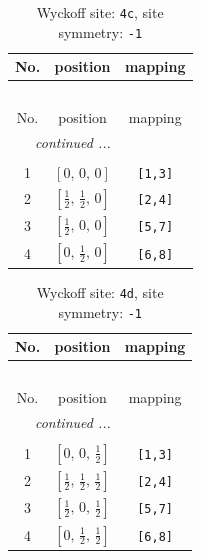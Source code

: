 \documentclass[fleqn,8pt]{jsarticle}
\begin{document}
\renewcommand{\arraystretch}{1.2}
\begin{longtable}{ccc}
\caption{Wyckoff site: {\tt 4c}, site symmetry: {\tt -1}}
 \\
 \hline \hline
No. & position & mapping \\ \hline \endfirsthead

\multicolumn{2}{l}{\tablename\ \thetable{}} \\
 \hline \hline
No. & position & mapping \\ \hline \endhead

 \hline \hline
\multicolumn{2}{r}{\footnotesize\it continued ...} \\ \endfoot

 \hline \hline
\multicolumn{2}{r}{} \\ \endlastfoot

1 & $\left[ 0,\, 0,\, 0 \right]$ & {\tt [1,3]} \\ \hline
2 & $\left[ \frac{1}{2},\, \frac{1}{2},\, 0 \right]$ & {\tt [2,4]} \\ \hline
3 & $\left[ \frac{1}{2},\, 0,\, 0 \right]$ & {\tt [5,7]} \\ \hline
4 & $\left[ 0,\, \frac{1}{2},\, 0 \right]$ & {\tt [6,8]} \\
\end{longtable}
\renewcommand{\arraystretch}{1.2}
\begin{longtable}{ccc}
\caption{Wyckoff site: {\tt 4d}, site symmetry: {\tt -1}}
 \\
 \hline \hline
No. & position & mapping \\ \hline \endfirsthead

\multicolumn{2}{l}{\tablename\ \thetable{}} \\
 \hline \hline
No. & position & mapping \\ \hline \endhead

 \hline \hline
\multicolumn{2}{r}{\footnotesize\it continued ...} \\ \endfoot

 \hline \hline
\multicolumn{2}{r}{} \\ \endlastfoot

1 & $\left[ 0,\, 0,\, \frac{1}{2} \right]$ & {\tt [1,3]} \\ \hline
2 & $\left[ \frac{1}{2},\, \frac{1}{2},\, \frac{1}{2} \right]$ & {\tt [2,4]} \\ \hline
3 & $\left[ \frac{1}{2},\, 0,\, \frac{1}{2} \right]$ & {\tt [5,7]} \\ \hline
4 & $\left[ 0,\, \frac{1}{2},\, \frac{1}{2} \right]$ & {\tt [6,8]} \\
\end{longtable}
\end{document}
